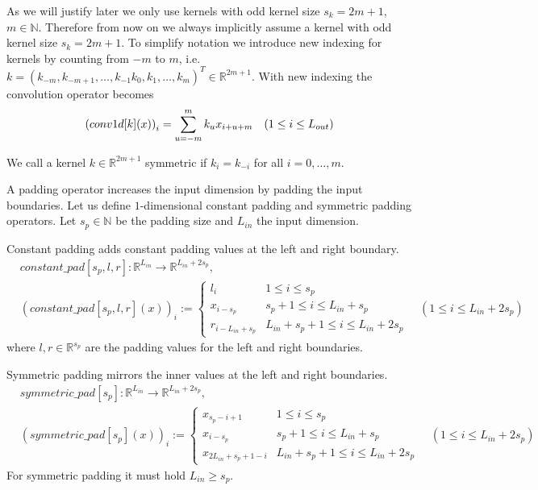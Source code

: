 \documentclass[twoside,a4paper]{article}
\begin{document}

As we will justify later we only use kernels with odd kernel size $s_k = 2m+1$, $m \in \mathbb{N}$.
Therefore from now on we always implicitly assume a kernel with odd kernel size $s_k = 2m+1$.
To simplify notation we introduce new indexing for kernels by counting from $-m$ to $m$,
i.e. $k = (k_{-m}, k_{-m+1}, \dots, k_{-1} k_0, k_1, \dots, k_{m})^T \in \mathbb{R}^{2m+1}$.
With new indexing the convolution operator becomes 
\begin{equation*}
	\left( conv1d[k](x) \right)_i = \sum_{u=-m}^{m} k_u x_{i+u+m} \quad
	(1 \leq i \leq L_{out})
\end{equation*}

We call a kernel $k \in \mathbb{R}^{2m+1}$ symmetric if $k_i = k_{-i}$ for all $i = 0, \dots, m$.

A padding operator increases the input dimension by padding
the input boundaries. Let us define $1$-dimensional constant padding and symmetric padding operators.
Let $s_p \in \mathbb{N}$ be the padding size and $L_{in}$ the input dimension.

Constant padding adds constant padding values at the left and right boundary.
\begin{align*}
	&constant\_pad[s_p,l,r] : \mathbb{R}^{L_{in}} \to \mathbb{R}^{L_{in}+2s_p}, \\[7pt]
	&(constant\_pad[s_p,l,r](x))_i :=
	\begin{cases}
		l_i & 1 \leq i \leq s_p \\
		x_{i-s_p} & s_p+1 \leq i \leq L_{in}+s_p \\
		r_{i-L_{in}+s_p} & L_{in}+s_p+1 \leq i \leq L_{in} + 2s_p
	\end{cases}
	\quad (1 \leq i \leq L_{in}+2s_p)
\end{align*}
where $l,r \in \mathbb{R}^{s_p}$ are the padding values for the left and right boundaries.

Symmetric padding mirrors the inner values at the left and right boundaries.
\begin{align*}
	&symmetric\_pad[s_p] : \mathbb{R}^{L_{in}} \to \mathbb{R}^{L_{in}+2s_p}, \\[7pt]
	&(symmetric\_pad[s_p](x))_i :=
	\begin{cases}
		x_{s_p-i+1} & 1 \leq i \leq s_p \\
		x_{i-s_p} & s_p+1 \leq i \leq L_{in}+s_p \\
		x_{2L_{in}+s_p+1-i} & L_{in}+s_p+1 \leq i \leq L_{in} + 2s_p
	\end{cases}
	\quad (1 \leq i \leq L_{in}+2s_p)
\end{align*}
For symmetric padding it must hold $L_{in} \geq s_p$.
\end{document}
